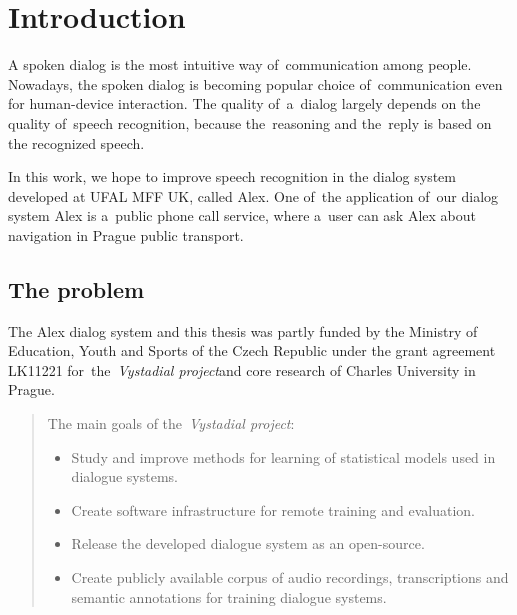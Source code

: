 \chapter{Introduction}
\label{chap:intro}

% 
% 
% 

A spoken dialog is the most intuitive way of~communication among people. Nowadays, the spoken dialog is becoming popular choice of~communication even for human-device interaction. The quality of~a~dialog largely depends on the quality of~speech recognition, because the~reasoning and the~reply is based on the recognized speech. 

In this work, we hope to improve speech recognition in the dialog system developed at UFAL MFF UK, called Alex. One of~the application of~our dialog system Alex is a~public phone call service, where a~user can ask Alex about navigation in Prague public transport.

\section{The problem} 
\label{sec:why}
The Alex dialog system and this thesis was partly funded by the Ministry of Education, Youth and Sports
of the Czech Republic under the grant agreement LK11221 for~the~{\it Vystadial project}\/and core research of Charles University in Prague.
\begin{quote}
    The main goals of the~{\it Vystadial project}\cite{jurcicek2012vystadial}:
    \begin{itemize}
        \item Study and improve methods for learning of statistical models used in dialogue systems. 
        \item Create software infrastructure for remote training and evaluation.
        \item Release the developed dialogue system as an open-source.
        \item Create publicly available corpus of audio recordings, transcriptions and semantic annotations for training dialogue systems.
    \end{itemize}
\end{quote}

